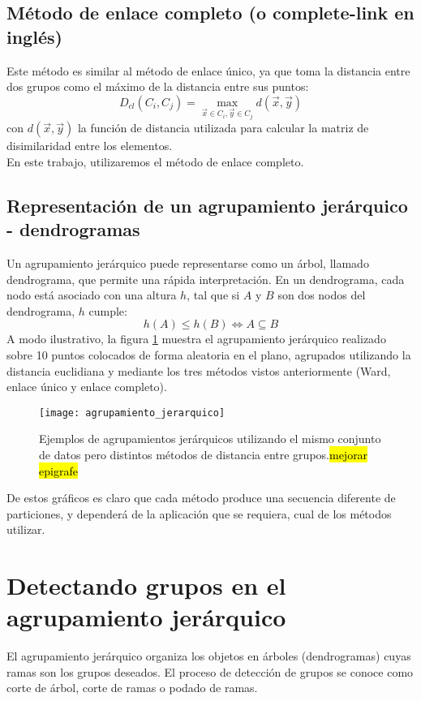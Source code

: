 \subsection{Método de enlace completo (o complete-link en inglés)}
Este método es similar al método de enlace único, ya que toma la distancia entre dos grupos como el máximo de la distancia entre sus puntos:
\begin{equation}
	D_{cl}(C_i, C_j) = \max\limits_{\vec{x} \in C_i, \vec{y} \in C_j} d(\vec{x}, \vec{y})
\end{equation}
con $d(\vec{x}, \vec{y})$ la función de distancia utilizada para calcular la matriz de disimilaridad entre los elementos.\\
En este trabajo, utilizaremos el método de enlace completo.
\cite{Shalizi2009}\cite{Gan2007}\cite{Johnson1967}

\subsection{Representación de un agrupamiento jerárquico - dendrogramas}
Un agrupamiento jerárquico puede representarse como un árbol, llamado dendrograma, que permite una rápida interpretación. En un dendrograma, cada nodo está asociado con una altura $h$, tal que si $A$ y $B$ son dos nodos del dendrograma, $h$ cumple:
\begin{equation}
	h(A) \leq h(B) \Leftrightarrow A \subseteq B
\end{equation}
A modo ilustrativo, la figura \ref{fig:agrupamiento_jerarquico} muestra el agrupamiento jerárquico realizado sobre 10 puntos colocados de forma aleatoria en el plano, agrupados utilizando la distancia euclidiana y mediante los tres métodos vistos anteriormente (Ward, enlace único y enlace completo).
\begin{figure}[h]
    \centering
    \texttt{[image: agrupamiento\_jerarquico]}
    \caption{Ejemplos de agrupamientos jerárquicos utilizando el mismo conjunto de datos pero distintos métodos de distancia entre grupos.\hl{mejorar epigrafe}}
    \label{fig:agrupamiento_jerarquico}
\end{figure}
De estos gráficos es claro que cada método produce una secuencia diferente de particiones, y dependerá de la aplicación que se requiera, cual de los métodos utilizar.
\section{Detectando grupos en el agrupamiento jerárquico}
El agrupamiento jerárquico organiza los objetos en árboles (dendrogramas) cuyas ramas son los grupos deseados. El proceso de detección de grupos se conoce como corte de árbol, corte de ramas o podado de ramas. 
